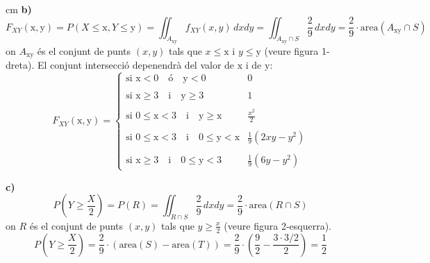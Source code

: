 \documentclass{article}
\begin{document}
 cm
\noindent
\textbf{b)} 
\[
F_{XY}(\mathrm{x}, \mathrm{y})=P(X \leq \mathrm{x}, Y \leq \mathrm{y})=\iint_{A_{\mathrm{x}\mathrm{y}}} f_{XY}(x, y) \, dxdy=
\iint_{A_{\mathrm{x}\mathrm{y}} \cap S} \frac{2}{9} \, dxdy=
\frac{2}{9} \cdot \text{area}(A_{\mathrm{x}\mathrm{y}} \cap S)
\]
\noindent
on $A_{\mathrm{x}\mathrm{y}}$ \'es el conjunt de punts $(x, y)$ tals que $x \leq \mathrm{x}$ i 
$y \leq \mathrm{y}$ (veure figura 1-dreta). El conjunt intersecci\'o depenendr\`a del valor de 
$\mathrm{x}$ i de $\mathrm{y}$:
\[
F_{XY}(\mathrm{x}, \mathrm{y})=\begin{cases}
\text{si } \mathrm{x} < 0 \quad \text{\'o} \quad \mathrm{y} < 0 & 0 \\ \\
\text{si } \mathrm{x} \geq 3 \quad \text{i} \quad \mathrm{y} \geq 3 & 1 \\ \\
\text{si } 0 \leq \mathrm{x} < 3 \quad \text{i} \quad \mathrm{y} \geq  \mathrm{x} & \frac{x^2}{2} \\ \\
\text{si } 0 \leq \mathrm{x} < 3 \quad \text{i} \quad 0 \leq \mathrm{y} <  \mathrm{x} & \frac{1}{9} (2xy-y^2) \\ \\
\text{si } \mathrm{x} \geq 3 \quad \text{i} \quad 0 \leq \mathrm{y} < 3 & \frac{1}{9} (6y-y^2) 
\end{cases}
\]

\newpage
\noindent
\textbf{c)} 
\[
P(Y \geq \frac{X}{2})=P(R)=\iint_{R \cap S} \frac{2}{9} \, dxdy=\frac{2}{9} \cdot \text{area}(R \cap S)
\]
\noindent
on $R$ \'es el conjunt de punts $(x, y)$ tals que $y \geq \frac{x}{2}$ (veure figura 2-esquerra).
\[
P(Y \geq \frac{X}{2})=\frac{2}{9} \cdot (\text{area}(S)-   \text{area}(T))=
\frac{2}{9} \cdot ( \frac{9}{2} - \frac{3 \cdot 3/2}{2})=\frac{1}{2}
\]
\end{document}
